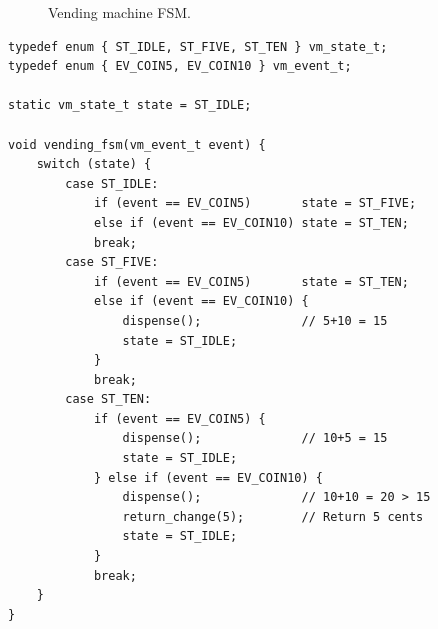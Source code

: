 \begin{example}
\begin{solution}
\begin{figure}[H]
\begin{tikzpicture}
\end{tikzpicture}
\caption{Vending machine FSM.}
\end{figure}

\begin{lstlisting}[style=C, caption={Vending machine FSM in C.}]
typedef enum { ST_IDLE, ST_FIVE, ST_TEN } vm_state_t;
typedef enum { EV_COIN5, EV_COIN10 } vm_event_t;

static vm_state_t state = ST_IDLE;

void vending_fsm(vm_event_t event) {
    switch (state) {
        case ST_IDLE:
            if (event == EV_COIN5)       state = ST_FIVE;
            else if (event == EV_COIN10) state = ST_TEN;
            break;
        case ST_FIVE:
            if (event == EV_COIN5)       state = ST_TEN;
            else if (event == EV_COIN10) {
                dispense();              // 5+10 = 15
                state = ST_IDLE;
            }
            break;
        case ST_TEN:
            if (event == EV_COIN5) {
                dispense();              // 10+5 = 15
                state = ST_IDLE;
            } else if (event == EV_COIN10) {
                dispense();              // 10+10 = 20 > 15
                return_change(5);        // Return 5 cents
                state = ST_IDLE;
            }
            break;
    }
}
\end{lstlisting}
\end{solution}
\end{example}

